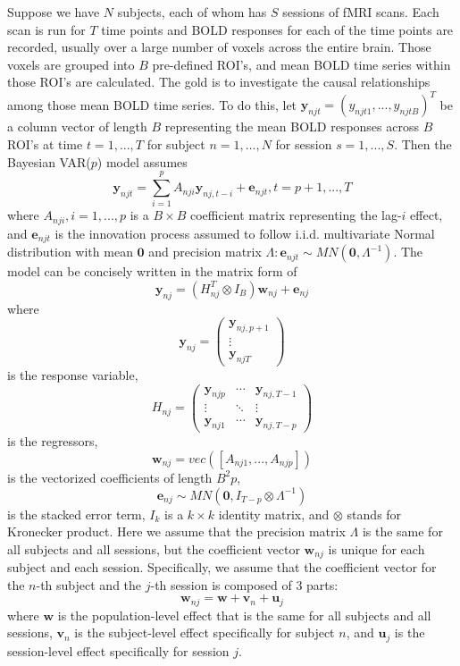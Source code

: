 \documentclass[12pt]{elsarticle}
\begin{document}
	Suppose we have $N$ subjects, each of whom has $S$ sessions of fMRI scans. 
	Each scan is run for $T$ time points and BOLD responses for each of the time points are recorded, usually over a large number of voxels across the entire brain.
	Those voxels are grouped into $B$ pre-defined ROI's, and mean BOLD time series within those ROI's are calculated.
	The gold is to investigate the causal relationships among those mean BOLD time series. 
	To do this, let $\boldsymbol{y}_{njt}=(y_{njt1},...,y_{njtB})^T$ be a column vector of length $B$ representing the mean BOLD responses across $B$ ROI's at time $t=1, ..., T$ for subject $n=1,...,N$ for session $s=1,...,S$.  
	Then the Bayesian VAR($p$) model assumes 
	\begin{equation} \label{eq:1}
		\boldsymbol{y}_{njt} = \sum_{i=1}^p A_{nji} \boldsymbol{y}_{nj,t-i}+ \boldsymbol{e}_{njt},  t=p+1,...,T
	\end{equation}
	where $A_{nji}, i=1,...,p$ is a $B\times B$ coefficient matrix representing the lag-$i$ effect, and $ \boldsymbol{e}_{njt}$ is the innovation process assumed to follow i.i.d. multivariate Normal distribution with mean $\boldsymbol{0}$ and precision matrix $\Lambda: \boldsymbol{e}_{njt} \sim MN(\boldsymbol{0}, \Lambda^{-1})$.
	The model can be concisely written in the matrix form of
	\begin{equation} \label{eq:2}
		\boldsymbol{y}_{nj} = \left(H_{nj}^T \otimes I_B \right)\boldsymbol{w}_{nj} + \boldsymbol{e}_{nj}
	\end{equation}
	where
	\[\boldsymbol{y}_{nj}=
	\begin{pmatrix}
	\boldsymbol{y}_{nj,p+1}\\
	\vdots \\
	\boldsymbol{y}_{njT}
	\end{pmatrix}
	\]
	is the response variable, 
	\[H_{nj}=
	\begin{pmatrix}
	\boldsymbol{y}_{njp} & \cdots  & \boldsymbol{y}_{nj,T-1}\\
	\vdots &  \ddots & \vdots\\
	\boldsymbol{y}_{nj1} & \cdots & \boldsymbol{y}_{nj,T-p}
	\end{pmatrix}
	\]
	is the regressors,
	\[\boldsymbol{w}_{nj}=vec([A_{nj1},...,A_{njp}])\]
	is the vectorized coefficients of length $B^2p$, 
	\[\boldsymbol{e}_{nj} \sim MN(\textbf{0}, I_{T-p} \otimes \Lambda^{-1})\]
	is the stacked error term, $I_k$ is a $k\times k$ identity matrix, and $\otimes$ stands for Kronecker product.
	Here we assume that the precision matrix $\Lambda$ is the same for all subjects and all sessions, but the coefficient vector $\boldsymbol{w}_{nj}$ is unique for each subject and each session.
	Specifically, we assume that the coefficient vector for the $n$-th subject and the $j$-th session is composed of 3 parts:
	\begin{equation} \label{eq:3}
		\boldsymbol{w}_{nj}=\boldsymbol{w}+\boldsymbol{v}_{n} + \boldsymbol{u}_{j}
	\end{equation}
	where $\boldsymbol{w}$ is the population-level effect that is the same for all subjects and all sessions, $\boldsymbol{v}_{n}$ is the subject-level effect specifically for subject $n$, and $\boldsymbol{u}_{j}$ is the session-level effect specifically for session $j$. 
	
\end{document}
